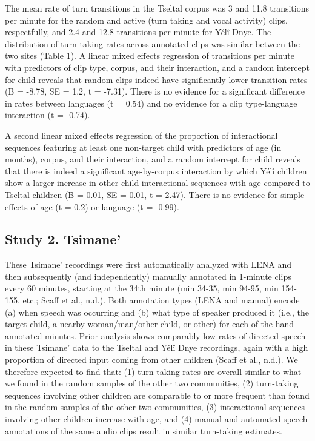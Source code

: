 \documentclass[10pt, letterpaper]{article}
\begin{document}
The mean rate of turn transitions in the Tseltal corpus was 3 and 11.8
transitions per minute for the random and active (turn taking and vocal
activity) clips, respectfully, and 2.4 and 12.8 transitions per minute
for Yélî Dnye. The distribution of turn taking rates across annotated
clips was similar between the two sites (Table 1). A linear mixed
effects regression of transitions per minute with predictors of clip
type, corpus, and their interaction, and a random intercept for child
reveals that random clips indeed have significantly lower transition
rates (B = -8.78, SE = 1.2, t = -7.31). There is no evidence for a
significant difference in rates between languages (t = 0.54) and no
evidence for a clip type-language interaction (t = -0.74).

A second linear mixed effects regression of the proportion of
interactional sequences featuring at least one non-target child with
predictors of age (in months), corpus, and their interaction, and a
random intercept for child reveals that there is indeed a significant
age-by-corpus interaction by which Yélî children show a larger increase
in other-child interactional sequences with age compared to Tseltal
children (B = 0.01, SE = 0.01, t = 2.47). There is no evidence for
simple effects of age (t = 0.2) or language (t = -0.99).

\hypertarget{study-2.-tsimane}{%
\subsection{Study 2. Tsimane'}\label{study-2.-tsimane}}

These Tsimane' recordings were first automatically analyzed with LENA
and then subsequently (and independently) manually annotated in 1-minute
clips every 60 minutes, starting at the 34th minute (min 34-35, min
94-95, min 154-155, etc.; Scaff et al., n.d.). Both annotation types
(LENA and manual) encode (a) when speech was occurring and (b) what type
of speaker produced it (i.e., the target child, a nearby woman/man/other
child, or other) for each of the hand-annotated minutes. Prior analysis
shows comparably low rates of directed speech in these Tsimane' data to
the Tseltal and Yélî Dnye recordings, again with a high proportion of
directed input coming from other children (Scaff et al., n.d.). We
therefore expected to find that: (1) turn-taking rates are overall
similar to what we found in the random samples of the other two
communities, (2) turn-taking sequences involving other children are
comparable to or more frequent than found in the random samples of the
other two communities, (3) interactional sequences involving other
children increase with age, and (4) manual and automated speech
annotations of the same audio clips result in similar turn-taking
estimates.
\end{document}
